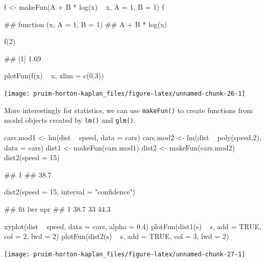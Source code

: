 \begin{Schunk}
\begin{Sinput}
f <- makeFun(A + B * log(x) ~ x, A = 1, B = 1)
f
\end{Sinput}
\begin{Soutput}
## function (x, A = 1, B = 1) 
## A + B * log(x)
\end{Soutput}
\begin{Sinput}
f(2)
\end{Sinput}
\begin{Soutput}
## [1] 1.69
\end{Soutput}
\begin{Sinput}
plotFun(f(x) ~ x, xlim = c(0,3))
\end{Sinput}


\begin{center}\texttt{[image: pruim-horton-kaplan\_files/figure-latex/unnamed-chunk-26-1]} \end{center}

\end{Schunk}

More interestingly for statistics, we can use \texttt{makeFun()} to
create functions from model objects created by \texttt{lm()} and
\texttt{glm()}.

\begin{Schunk}
\begin{Sinput}
cars.mod1 <- lm(dist ~ speed, data = cars)
cars.mod2 <- lm(dist ~ poly(speed,2), data = cars)
dist1 <- makeFun(cars.mod1)
dist2 <- makeFun(cars.mod2)
dist2(speed = 15)
\end{Sinput}
\begin{Soutput}
##    1 
## 38.7
\end{Soutput}
\begin{Sinput}
dist2(speed = 15, interval = "confidence")
\end{Sinput}
\begin{Soutput}
##    fit lwr  upr
## 1 38.7  33 44.3
\end{Soutput}
\begin{Sinput}
xyplot(dist ~ speed, data = cars, alpha = 0.4)
plotFun(dist1(s) ~ s, add = TRUE, col = 2, lwd = 2)
plotFun(dist2(s) ~ s, add = TRUE, col = 3, lwd = 2)
\end{Sinput}


\begin{center}\texttt{[image: pruim-horton-kaplan\_files/figure-latex/unnamed-chunk-27-1]} \end{center}

\end{Schunk}

